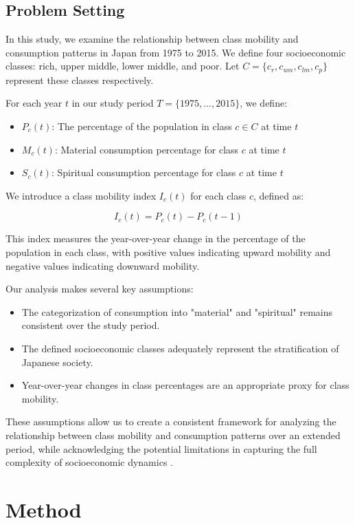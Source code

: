 \documentclass{article} %
\begin{document}
\subsection{Problem Setting}
In this study, we examine the relationship between class mobility and consumption patterns in Japan from 1975 to 2015. We define four socioeconomic classes: rich, upper middle, lower middle, and poor. Let $C = \{c_r, c_{um}, c_{lm}, c_p\}$ represent these classes respectively.

For each year $t$ in our study period $T = \{1975, \ldots, 2015\}$, we define:

\begin{itemize}
    \item $P_c(t)$: The percentage of the population in class $c \in C$ at time $t$
    \item $M_c(t)$: Material consumption percentage for class $c$ at time $t$
    \item $S_c(t)$: Spiritual consumption percentage for class $c$ at time $t$
\end{itemize}

We introduce a class mobility index $I_c(t)$ for each class $c$, defined as:

\[I_c(t) = P_c(t) - P_c(t-1)\]

This index measures the year-over-year change in the percentage of the population in each class, with positive values indicating upward mobility and negative values indicating downward mobility.

Our analysis makes several key assumptions:
\begin{itemize}
    \item The categorization of consumption into "material" and "spiritual" remains consistent over the study period.
    \item The defined socioeconomic classes adequately represent the stratification of Japanese society.
    \item Year-over-year changes in class percentages are an appropriate proxy for class mobility.
\end{itemize}

These assumptions allow us to create a consistent framework for analyzing the relationship between class mobility and consumption patterns over an extended period, while acknowledging the potential limitations in capturing the full complexity of socioeconomic dynamics \citep{Brockington2019AssetsAD}.

\section{Method}
\label{sec:method}
\end{document}
